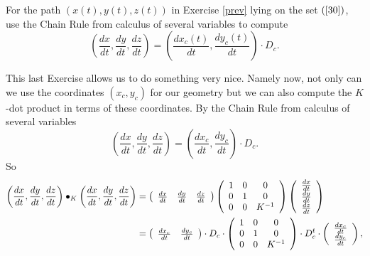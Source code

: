 \begin{exercise}
For the path $\left(  x\left(  t\right)  ,y\left(  t\right)  ,z\left(
t\right)  \right)  $ in Exercise \ref{prev} lying on the set $\left(
\ref{30}\right)  $, use the Chain Rule from calculus of several variables to
compute%
\[
\left(  \frac{dx}{dt},\frac{dy}{dt},\frac{dz}{dt}\right)  =\left(
\frac{dx_{c}\left(  t\right)  }{dt},\frac{dy_{c}\left(  t\right)  }%
{dt}\right)  \cdot D_{c}.
\]

\end{exercise}

This last Exercise allows us to do something very nice. Namely now, not only
can we use the coordinates $\left(  x_{c},y_{c}\right)  $ for our geometry but
we can also compute the $K$-dot product in terms of these coordinates. By the
Chain Rule from calculus of several variables%
\[
\left(  \frac{dx}{dt},\frac{dy}{dt},\frac{dz}{dt}\right)  =\left(
\frac{dx_{c}}{dt},\frac{dy_{c}}{dt}\right)  \cdot D_{c}.
\]
So%
\begin{align*}
\left(  \frac{dx}{dt},\frac{dy}{dt},\frac{dz}{dt}\right)  \bullet_{K}\left(
\frac{dx}{dt},\frac{dy}{dt},\frac{dz}{dt}\right)   &  =\left(
\begin{array}
[c]{ccc}%
\frac{dx}{dt} & \frac{dy}{dt} & \frac{dz}{dt}%
\end{array}
\right)  \left(
\begin{array}
[c]{ccc}%
1 & 0 & 0\\
0 & 1 & 0\\
0 & 0 & K^{-1}%
\end{array}
\right)  \left(
\begin{array}
[c]{c}%
\frac{dx}{dt}\\
\frac{dy}{dt}\\
\frac{dz}{dt}%
\end{array}
\right) \\
&  =\left(
\begin{array}
[c]{cc}%
\frac{dx_{c}}{dt} & \frac{dy_{c}}{dt}%
\end{array}
\right)  \cdot D_{c}\cdot\left(
\begin{array}
[c]{ccc}%
1 & 0 & 0\\
0 & 1 & 0\\
0 & 0 & K^{-1}%
\end{array}
\right)  \cdot D_{c}^{t}\cdot\left(
\begin{array}
[c]{c}%
\frac{dx_{c}}{dt}\\
\frac{dy_{c}}{dt}%
\end{array}
\right)  ,
\end{align*}


